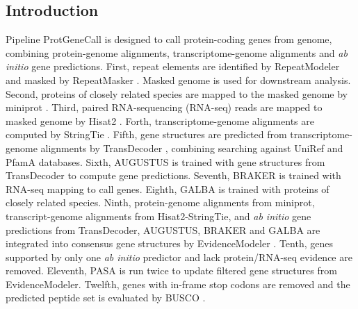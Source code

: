 \documentclass[11pt]{article}
\begin{document}
\begin{sloppypar}
\subsection{Introduction}
Pipeline ProtGeneCall is designed to call protein-coding genes from genome, combining protein-genome alignments, transcriptome-genome alignments and \textit{ab initio} gene predictions. 
First, repeat elements are identified by RepeatModeler \parencite{smit2015repeatmodeler} and masked by RepeatMasker \parencite{smit2015repeatmasker}. 
Masked genome is used for downstream analysis. 
Second, proteins of closely related species are mapped to the masked genome by miniprot \parencite{li2023protein}. 
Third, paired RNA-sequencing (RNA-seq) reads are mapped to masked genome by Hisat2 \parencite{kim2019graph}. 
Forth, transcriptome-genome alignments are computed by StringTie \parencite{pertea2015stringtie}. 
Fifth, gene structures are predicted from transcriptome-genome alignments by TransDecoder \parencite{haas2016transdecoder}, combining searching against UniRef and PfamA databases. 
Sixth, AUGUSTUS \parencite{stanke2003gene} is trained with gene structures from TransDecoder to compute gene predictions. 
Seventh, BRAKER \parencite{hoff2019whole} is trained with RNA-seq mapping to call genes. 
Eighth, GALBA \parencite{hoff2019whole} is trained with proteins of closely related species. 
Ninth, protein-genome alignments from miniprot, transcript-genome alignments from Hisat2-StringTie, and \textit{ab initio} gene predictions from TransDecoder, AUGUSTUS, BRAKER and GALBA are integrated into consensus gene structures by EvidenceModeler \parencite{haas2008automated}. 
Tenth, genes supported by only one \textit{ab initio} predictor and lack protein/RNA-seq evidence are removed. 
Eleventh, PASA \parencite{haas2008automated} is run twice to update filtered gene structures from EvidenceModeler. 
Twelfth, genes with in-frame stop codons are removed and the predicted peptide set is evaluated by BUSCO \parencite{simao2015busco}.

\end{sloppypar}
\end{document}
